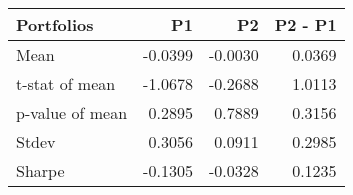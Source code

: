 \begin{tabular}{lrrr}
\toprule
Portfolios & P1 & P2 & P2 - P1 \\
\midrule
Mean & -0.0399 & -0.0030 & 0.0369 \\
t-stat of mean & -1.0678 & -0.2688 & 1.0113 \\
p-value of mean & 0.2895 & 0.7889 & 0.3156 \\
Stdev & 0.3056 & 0.0911 & 0.2985 \\
Sharpe & -0.1305 & -0.0328 & 0.1235 \\
\bottomrule
\end{tabular}
